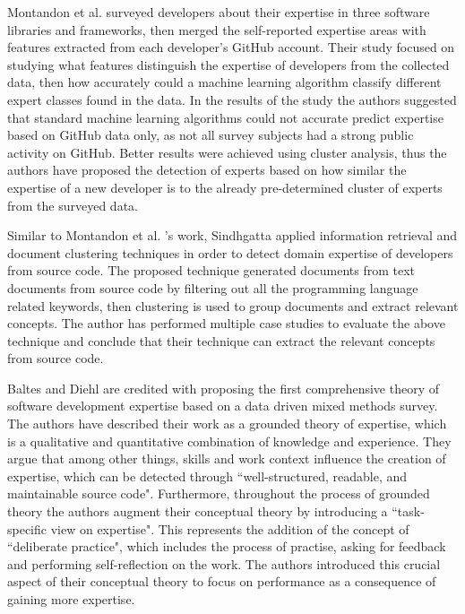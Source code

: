         Montandon et al. \cite{montandon2019identifying} surveyed developers about their expertise in three software libraries and frameworks, then merged the self-reported expertise areas with features extracted from each developer's GitHub account. Their study focused on studying what features distinguish the expertise of developers from the collected data, then how accurately could a machine learning algorithm classify different expert classes found in the data. In the results of the study the authors suggested that standard machine learning algorithms could not accurate predict expertise based on GitHub data only, as not all survey subjects had a strong public activity on GitHub. Better results were achieved using cluster analysis, thus the authors have proposed the detection of experts based on how similar the expertise of a new developer is to the already pre-determined cluster of experts from the surveyed data.
        
        Similar to Montandon et al. \cite{montandon2019identifying}'s work, Sindhgatta \cite{sindhgatta2008identifying} applied information retrieval and document clustering techniques in order to detect domain expertise of developers from source code. The proposed technique generated documents from text documents from source code by filtering out all the programming language related keywords, then clustering is used to group documents and extract relevant concepts. The author has performed multiple case studies to evaluate the above technique and conclude that their technique can extract the relevant concepts from source code. 
        
        Baltes and Diehl \cite{baltes2018towards} are credited with proposing the first comprehensive theory of software development expertise based on a data driven mixed methods survey. The authors have described their work as a grounded theory of expertise, which is a qualitative and quantitative combination of knowledge and experience. They argue that among other things, skills and work context influence the creation of expertise, which can be detected through ``well-structured, readable, and maintainable source code". Furthermore, throughout the process of grounded theory the authors augment their conceptual theory by introducing a ``task-specific view on expertise". This represents the addition of the concept of ``deliberate practice", which includes the process of practise, asking for feedback and performing self-reflection on the work. The authors introduced this crucial aspect of their conceptual theory to focus on performance as a consequence of gaining more expertise.
        
